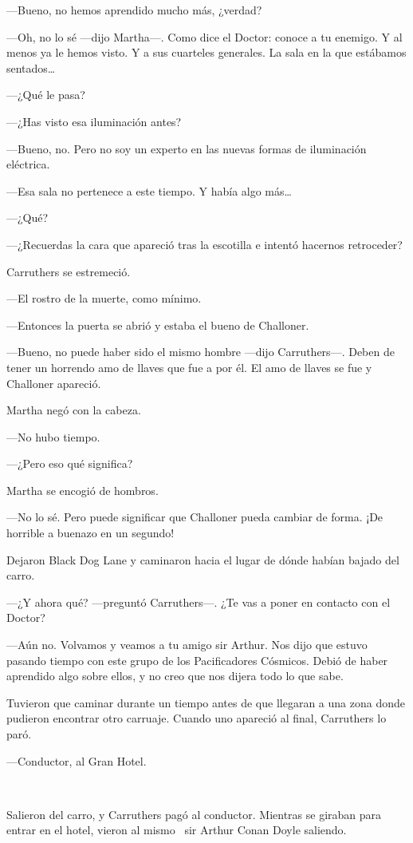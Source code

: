 ---Bueno, no hemos aprendido mucho más, ¿verdad?

---Oh, no lo sé ---dijo Martha---. Como dice el Doctor: conoce a tu
enemigo. Y al menos ya le hemos visto. Y a sus cuarteles generales. La
sala en la que estábamos sentados\ldots{}

---¿Qué le pasa?

---¿Has visto esa iluminación antes?

---Bueno, no. Pero no soy un experto en las nuevas formas de iluminación
eléctrica.

---Esa sala no pertenece a este tiempo. Y había algo más\ldots{}

---¿Qué?

---¿Recuerdas la cara que apareció tras la escotilla e intentó hacernos
retroceder?

Carruthers se estremeció.

---El rostro de la muerte, como mínimo.

---Entonces la puerta se abrió y estaba el bueno de Challoner.

---Bueno, no puede haber sido el mismo hombre ---dijo Carruthers---.
Deben de tener un horrendo amo de llaves que fue a por él. El amo de
llaves se fue y Challoner apareció.

Martha negó con la cabeza.

---No hubo tiempo.

---¿Pero eso qué significa?

Martha se encogió de hombros.

---No lo sé. Pero puede significar que Challoner pueda cambiar de forma.
¡De horrible a buenazo en un segundo!

Dejaron Black Dog Lane y caminaron hacia el lugar de dónde habían bajado
del carro.

---¿Y ahora qué? ---preguntó Carruthers---. ¿Te vas a poner en contacto
con el Doctor?

---Aún no. Volvamos y veamos a tu amigo sir Arthur. Nos dijo que estuvo
pasando tiempo con este grupo de los Pacificadores Cósmicos. Debió de
haber aprendido algo sobre ellos, y no creo que nos dijera todo lo que
sabe.

Tuvieron que caminar durante un tiempo antes de que llegaran a una zona
donde pudieron encontrar otro carruaje. Cuando uno apareció al final,
Carruthers lo paró.

---Conductor, al Gran Hotel.

~

Salieron del carro, y Carruthers pagó al conductor. Mientras se giraban
para entrar en el hotel, vieron al mismo ~sir Arthur Conan Doyle
saliendo.


